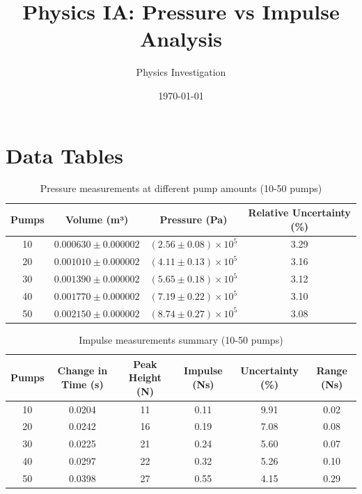 \documentclass[11pt]{article}
\title{Physics IA: Pressure vs Impulse Analysis}
\author{Physics Investigation}
\date{\today}
\begin{document}
\maketitle

\section{Data Tables}

\begin{table}[H]
\centering
\caption{Pressure measurements at different pump amounts (10-50 pumps)}
\begin{tabular}{|c|c|c|c|}
\hline
\textbf{Pumps} & \textbf{Volume (m³)} & \textbf{Pressure (Pa)} & \textbf{Relative Uncertainty (\%)} \\
\hline
10 & $0.000630 \pm 0.000002$ & $(2.56 \pm 0.08) \times 10^5$ & 3.29 \\
20 & $0.001010 \pm 0.000002$ & $(4.11 \pm 0.13) \times 10^5$ & 3.16 \\
30 & $0.001390 \pm 0.000002$ & $(5.65 \pm 0.18) \times 10^5$ & 3.12 \\
40 & $0.001770 \pm 0.000002$ & $(7.19 \pm 0.22) \times 10^5$ & 3.10 \\
50 & $0.002150 \pm 0.000002$ & $(8.74 \pm 0.27) \times 10^5$ & 3.08 \\
\hline
\end{tabular}
\label{tab:pressure_data}
\end{table}

\begin{table}[H]
\centering
\caption{Impulse measurements summary (10-50 pumps)}
\begin{tabular}{|c|c|c|c|c|c|}
\hline
\textbf{Pumps} & \textbf{Change in Time (s)} & \textbf{Peak Height (N)} & \textbf{Impulse (Ns)} & \textbf{Uncertainty (\%)} & \textbf{Range (Ns)} \\
\hline
10 & 0.0204 & 11 & 0.11 & 9.91 & 0.02 \\
20 & 0.0242 & 16 & 0.19 & 7.08 & 0.08 \\
30 & 0.0225 & 21 & 0.24 & 5.60 & 0.07 \\
40 & 0.0297 & 22 & 0.32 & 5.26 & 0.10 \\
50 & 0.0398 & 27 & 0.55 & 4.15 & 0.29 \\
\hline
\end{tabular}
\label{tab:impulse_data}
\end{table}

\newpage
\end{document}
